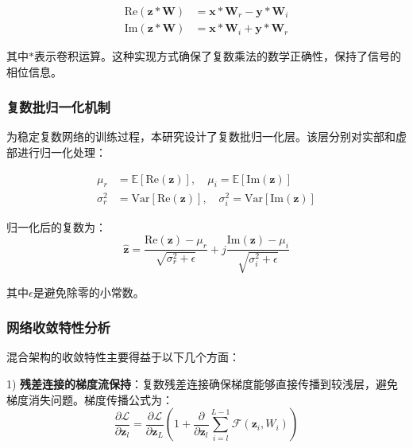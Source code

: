 \documentclass[conference]{IEEEtran}
\begin{document}
\begin{equation}
\begin{aligned}
\text{Re}(\mathbf{z} * \mathbf{W}) &= \mathbf{x} * \mathbf{W}_r - \mathbf{y} * \mathbf{W}_i \\
\text{Im}(\mathbf{z} * \mathbf{W}) &= \mathbf{x} * \mathbf{W}_i + \mathbf{y} * \mathbf{W}_r
\end{aligned}
\end{equation}

其中$*$表示卷积运算。这种实现方式确保了复数乘法的数学正确性，保持了信号的相位信息。

\subsubsection{复数批归一化机制}

为稳定复数网络的训练过程，本研究设计了复数批归一化层。该层分别对实部和虚部进行归一化处理：

\begin{equation}
\begin{aligned}
\mu_r &= \mathbb{E}[\text{Re}(\mathbf{z})], \quad \mu_i = \mathbb{E}[\text{Im}(\mathbf{z})] \\
\sigma_r^2 &= \text{Var}[\text{Re}(\mathbf{z})], \quad \sigma_i^2 = \text{Var}[\text{Im}(\mathbf{z})]
\end{aligned}
\end{equation}

归一化后的复数为：
\begin{equation}
\hat{\mathbf{z}} = \frac{\text{Re}(\mathbf{z}) - \mu_r}{\sqrt{\sigma_r^2 + \epsilon}} + j\frac{\text{Im}(\mathbf{z}) - \mu_i}{\sqrt{\sigma_i^2 + \epsilon}}
\end{equation}

其中$\epsilon$是避免除零的小常数。

\subsubsection{网络收敛特性分析}

混合架构的收敛特性主要得益于以下几个方面：

1) \textbf{残差连接的梯度流保持}：复数残差连接确保梯度能够直接传播到较浅层，避免梯度消失问题。梯度传播公式为：
\begin{equation}
\frac{\partial \mathcal{L}}{\partial \mathbf{z}_l} = \frac{\partial \mathcal{L}}{\partial \mathbf{z}_L} \left(1 + \frac{\partial}{\partial \mathbf{z}_l}\sum_{i=l}^{L-1}\mathcal{F}(\mathbf{z}_i, W_i)\right)
\end{equation}
\end{document}
